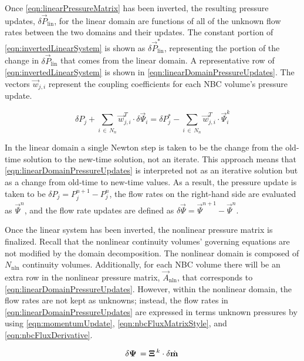 Once \eqref{eqn:linearPressureMatrix} has been inverted, the resulting pressure updates, $\delta \vec{P}_{\text{lin}}$, for the linear domain are functions of all of the unknown flow rates between the two domains and their updates.
The constant portion of \eqref{eqn:invertedLinearSystem} is shown as $\delta \vec{P}_{\text{lin}}^{*}$, representing the portion of the change in $\delta \vec{P}_{\text{lin}}$ that comes from the linear domain.
A representative row of \eqref{eqn:invertedLinearSystem} is shown in \eqref{eqn:linearDomainPressureUpdates}.
The vectors $\vec{w}_{j, i}$ represent the coupling coefficients for each NBC volume's pressure update.

\begin{equation}
\label{eqn:linearDomainPressureUpdates}
\delta P_{j} + \sum_{i\, \in \, N_{n}} \vec{w}^{T}_{j, i} \cdot \delta \vec{\Psi}_{i} = \delta P_{j}^{*} - \sum_{i\, \in \, N_{n}} \vec{w}^{T}_{j, i} \cdot{} \vec{\Psi}^{k}_{i}
\end{equation}

In the linear domain a single Newton step is taken to be the change from the old-time solution to the new-time solution, not an iterate.
This approach means that \eqref{eqn:linearDomainPressureUpdates} is interpreted not as an iterative solution but as a change from old-time to new-time values.
As a result, the pressure update is taken to be $\delta P_{j} = P_{j}^{n+1} - P_{j}^{n}$, the flow rates on the right-hand side are evaluated as $\vec{\Psi}^{n}$, and the flow rate updates are defined as $\delta \vec{\Psi} = \vec{\Psi}^{n+1} - \vec{\Psi}^{n}$.

Once the linear system has been inverted, the nonlinear pressure matrix is finalized.
Recall that the nonlinear continuity volumes' governing equations are not modified by the domain decomposition.
The nonlinear domain is composed of $N_{\text{nln}}$ continuity volumes.
Additionally, for each NBC volume there will be an extra row in the nonlinear pressure matrix, $\vec{A}_{\text{nln}}$, that corresponds to \eqref{eqn:linearDomainPressureUpdates}.
However, within the nonlinear domain, the flow rates are not kept as unknowns; instead, the flow rates in \eqref{eqn:linearDomainPressureUpdates} are expressed in terms unknown pressures by using \eqref{eqn:momentumUpdate}, \eqref{eqn:nbcFluxMatrixStyle}, and \eqref{eqn:nbcFluxDerivative}.

\begin{equation}
\label{eqn:nbcFluxDerivative}
\delta \vec{\Psi} = \vec{\Xi}^{k} \cdot \delta \momVec{}
\end{equation}

